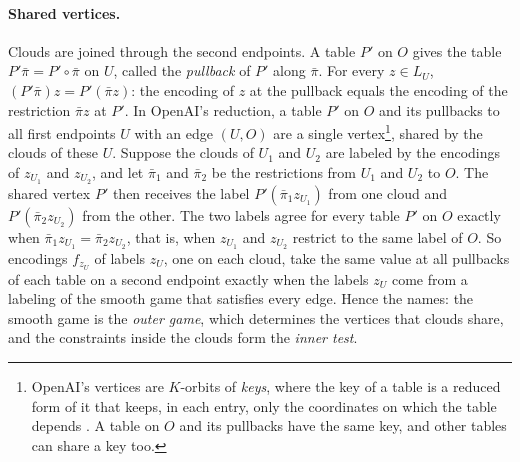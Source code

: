 \paragraph{Shared vertices.}\label{nt:shared} Clouds are joined through the second endpoints. A table $P'$ on $O$ gives the table $P'\bar\pi=P'\circ\bar\pi$ on $U$, called the \emph{pullback} of $P'$ along $\bar\pi$. For every $z\in L_U$, $(P'\bar\pi)z=P'(\bar\pi z)$: the encoding of $z$ at the pullback equals the encoding of the restriction $\bar\pi z$ at $P'$. In OpenAI's reduction, a table $P'$ on $O$ and its pullbacks to all first endpoints $U$ with an edge $(U,O)$ are a single vertex\footnote{OpenAI's vertices are $K$-orbits of \emph{keys}, where the key of a table is a reduced form of it that keeps, in each entry, only the coordinates on which the table depends \cite[Section~4.3]{OAI}. A table on $O$ and its pullbacks have the same key, and other tables can share a key too.}, shared by the clouds of these $U$. Suppose the clouds of $U_1$ and $U_2$ are labeled by the encodings of $z_{U_1}$ and $z_{U_2}$, and let $\bar\pi_1$ and $\bar\pi_2$ be the restrictions from $U_1$ and $U_2$ to $O$. The shared vertex $P'$ then receives the label $P'(\bar\pi_1z_{U_1})$ from one cloud and $P'(\bar\pi_2z_{U_2})$ from the other. The two labels agree for every table $P'$ on $O$ exactly when $\bar\pi_1z_{U_1}=\bar\pi_2z_{U_2}$, that is, when $z_{U_1}$ and $z_{U_2}$ restrict to the same label of $O$. So encodings $f_{z_U}$ of labels $z_U$, one on each cloud, take the same value at all pullbacks of each table on a second endpoint exactly when the labels $z_U$ come from a labeling of the smooth game that satisfies every edge. Hence the names: the smooth game is the \emph{outer game}, which determines the vertices that clouds share, and the constraints inside the clouds form the \emph{inner test}.

